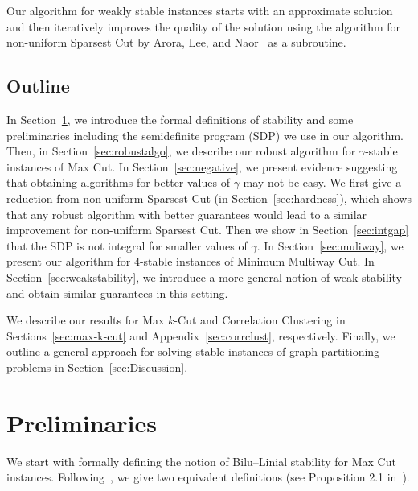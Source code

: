 \documentclass[twoside,leqno,twocolumn]{article}
\begin{document}
Our algorithm for weakly stable instances starts with an approximate solution and then iteratively improves the quality of the solution 
using the algorithm for non-uniform Sparsest Cut by Arora, Lee, and Naor~\cite{ALN} as a subroutine.

\subsection{Outline}
In Section~\ref{sec:prelims}, we introduce the formal definitions of stability and some preliminaries including the semidefinite program (SDP) we use in our algorithm. Then, in Section~\ref{sec:robustalgo}, we describe our robust algorithm for $\gamma$-stable instances of Max Cut. 
In Section~\ref{sec:negative}, we present evidence suggesting that obtaining algorithms for better values of $\gamma$ may not be easy. We first give a reduction from non-uniform Sparsest Cut (in Section~\ref{sec:hardness}), which shows that any robust algorithm with better guarantees would lead to a similar improvement for non-uniform Sparsest Cut. Then we show in Section~\ref{sec:intgap} that the SDP is not integral for smaller values of $\gamma$. 
In Section~\ref{sec:muliway}, we present our algorithm for $4$-stable instances of Minimum Multiway Cut.
In Section~\ref{sec:weakstability}, we introduce a more general notion of weak stability and obtain similar guarantees in
this setting. 


We describe our results for Max $k$-Cut and Correlation Clustering
in Sections~\ref{sec:max-k-cut} and Appendix~\ref{sec:corrclust}, respectively.
Finally, we outline a general approach for solving stable instances of graph partitioning problems in Section~\ref{sec:Discussion}. 
 

\section{Preliminaries}\label{sec:prelims}
We start with formally defining the notion of Bilu--Linial stability for Max Cut instances. Following~\cite{BL}, we give two equivalent
definitions (see Proposition 2.1 in~\cite{BL}).

\ifSODA
\pagebreak
\fi
\end{document}
